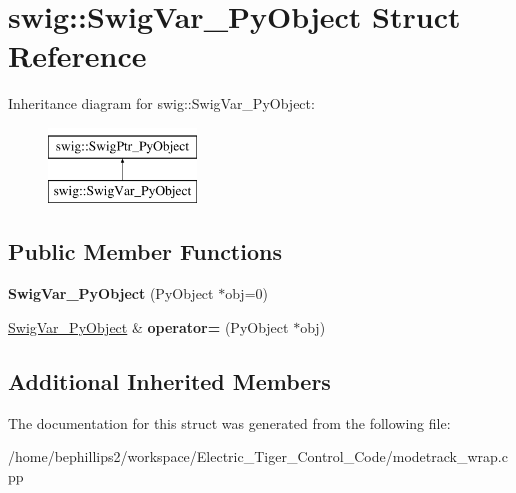 \hypertarget{structswig_1_1_swig_var___py_object}{\section{swig\-:\-:Swig\-Var\-\_\-\-Py\-Object Struct Reference}
\label{structswig_1_1_swig_var___py_object}
}
Inheritance diagram for swig\-:\-:Swig\-Var\-\_\-\-Py\-Object\-:\begin{figure}[H]
\begin{center}
\leavevmode
\includegraphics[height=2.000000cm]{structswig_1_1_swig_var___py_object}
\end{center}
\end{figure}
\subsection*{Public Member Functions}
\begin{DoxyCompactItemize}
\item 
\hypertarget{structswig_1_1_swig_var___py_object_a2b61f843215bceaff8ec2ea6e92d46c2}{{\bfseries Swig\-Var\-\_\-\-Py\-Object} (Py\-Object $\ast$obj=0)}\label{structswig_1_1_swig_var___py_object_a2b61f843215bceaff8ec2ea6e92d46c2}

\item 
\hypertarget{structswig_1_1_swig_var___py_object_a7e6053b64cf6e787b99a67b09cdc6d89}{\hyperlink{structswig_1_1_swig_var___py_object}{Swig\-Var\-\_\-\-Py\-Object} \& {\bfseries operator=} (Py\-Object $\ast$obj)}\label{structswig_1_1_swig_var___py_object_a7e6053b64cf6e787b99a67b09cdc6d89}

\end{DoxyCompactItemize}
\subsection*{Additional Inherited Members}


The documentation for this struct was generated from the following file\-:\begin{DoxyCompactItemize}
\item 
/home/bephillips2/workspace/\-Electric\-\_\-\-Tiger\-\_\-\-Control\-\_\-\-Code/modetrack\-\_\-wrap.\-cpp\end{DoxyCompactItemize}
